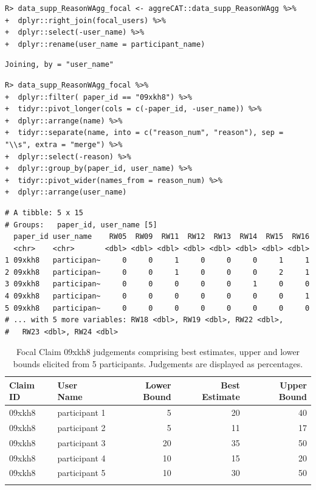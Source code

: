 \documentclass[article]{jss}
\begin{document}
\begin{verbatim}
R> data_supp_ReasonWAgg_focal <- aggreCAT::data_supp_ReasonWAgg %>%  
+  dplyr::right_join(focal_users) %>% 
+  dplyr::select(-user_name) %>% 
+  dplyr::rename(user_name = participant_name)
\end{verbatim}

\begin{verbatim}
Joining, by = "user_name"
\end{verbatim}

\begin{verbatim}
R> data_supp_ReasonWAgg_focal %>%
+  dplyr::filter( paper_id == "09xkh8") %>%
+  tidyr::pivot_longer(cols = c(-paper_id, -user_name)) %>%
+  dplyr::arrange(name) %>%
+  tidyr::separate(name, into = c("reason_num", "reason"), sep = "\\s", extra = "merge") %>%
+  dplyr::select(-reason) %>%
+  dplyr::group_by(paper_id, user_name) %>%
+  tidyr::pivot_wider(names_from = reason_num) %>%
+  dplyr::arrange(user_name)
\end{verbatim}

\begin{verbatim}
# A tibble: 5 x 15
# Groups:   paper_id, user_name [5]
  paper_id user_name    RW05  RW09  RW11  RW12  RW13  RW14  RW15  RW16
  <chr>    <chr>       <dbl> <dbl> <dbl> <dbl> <dbl> <dbl> <dbl> <dbl>
1 09xkh8   participan~     0     0     1     0     0     0     1     1
2 09xkh8   participan~     0     0     1     0     0     0     2     1
3 09xkh8   participan~     0     0     0     0     0     1     0     0
4 09xkh8   participan~     0     0     0     0     0     0     0     1
5 09xkh8   participan~     0     0     0     0     0     0     0     0
# ... with 5 more variables: RW18 <dbl>, RW19 <dbl>, RW22 <dbl>,
#   RW23 <dbl>, RW24 <dbl>
\end{verbatim}

\hypertarget{tbl-reason-wagg-focal-claim}{}
\begin{longtable}{llrrr}

\toprule
Claim ID & User Name & Lower Bound & Best Estimate & Upper Bound \\ 
\midrule
09xkh8 & participant 1 & 5 & 20 & 40 \\ 
09xkh8 & participant 2 & 5 & 11 & 17 \\ 
09xkh8 & participant 3 & 20 & 35 & 50 \\ 
09xkh8 & participant 4 & 10 & 15 & 20 \\ 
09xkh8 & participant 5 & 10 & 30 & 50 \\ 
\bottomrule
\caption{\label{tbl-reason-wagg-focal-claim}Focal Claim 09xkh8 judgements comprising best estimates, upper and lower
bounds elicited from 5 participants. Judgements are displayed as
percentages. }\tabularnewline
\end{longtable}
\end{document}
